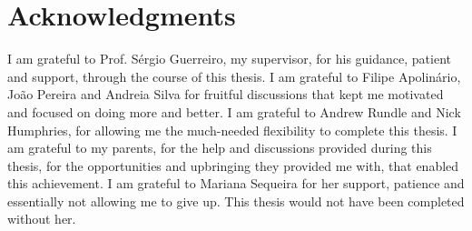\chapter*{Acknowledgments}

I am grateful to Prof. Sérgio Guerreiro, my supervisor, for his guidance, patient and support, through the course of this thesis. I am grateful to Filipe Apolinário, João Pereira and Andreia Silva for fruitful discussions that kept me motivated and focused on doing more and better. I am grateful to Andrew Rundle and Nick Humphries, for allowing me the much-needed flexibility to complete this thesis. I am grateful to my parents, for the help and discussions provided during this thesis, for the opportunities and upbringing they provided me with, that enabled this achievement. I am grateful to Mariana Sequeira for her support, patience and essentially not allowing me to give up. This thesis would not have been completed without her.